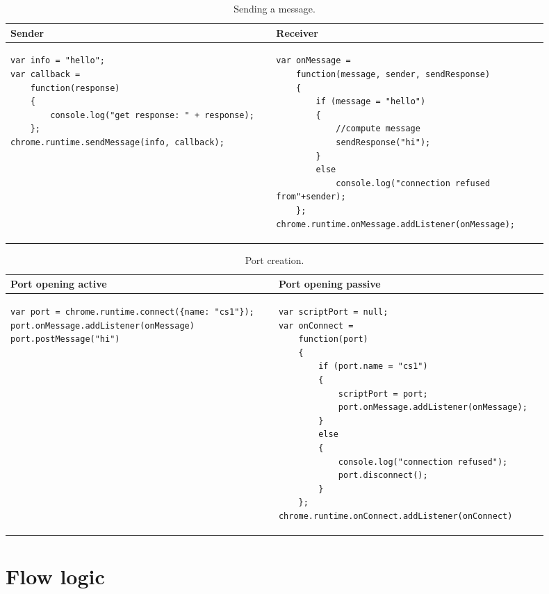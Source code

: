 \lstset{language=java,showstringspaces=false}
\begin{table}
\begin{small}
\begin{tabular}{p{0.45\linewidth} | p{0.45\linewidth}}
Sender & Receiver\\
\hline
\begin{lstlisting} 
var info = "hello";
var callback = 
	function(response) 
	{ 
		console.log("get response: " + response);
	};
chrome.runtime.sendMessage(info, callback);
\end{lstlisting}&
\begin{lstlisting} 
var onMessage = 
	function(message, sender, sendResponse) 
	{ 
		if (message = "hello") 
		{
		    //compute message
			sendResponse("hi");
		}
		else 
			console.log("connection refused from"+sender);
	};
chrome.runtime.onMessage.addListener(onMessage);
\end{lstlisting}\\
\end{tabular}
\end{small}
\caption{Sending a message.}
\label{tab:MPIMessage}
\end{table}

\begin{table}
\begin{small}
\begin{tabular}{p{0.45\linewidth} | p{0.45\linewidth}}
Port opening active & Port opening passive\\
\hline
\begin{lstlisting} 
var port = chrome.runtime.connect({name: "cs1"});
port.onMessage.addListener(onMessage)
port.postMessage("hi")
\end{lstlisting}&
\begin{lstlisting} 
var scriptPort = null;
var onConnect = 
	function(port) 
	{ 
		if (port.name = "cs1") 
		{
			scriptPort = port;
			port.onMessage.addListener(onMessage);
		} 
		else 
		{
			console.log("connection refused"); 
			port.disconnect();
		}
	};
chrome.runtime.onConnect.addListener(onConnect)
\end{lstlisting}\\
\end{tabular}
\end{small}
\caption{Port creation.}
\label{tab:MPIPort}
\end{table}


\section{Flow logic}
\label{sec:FlowLogic}
